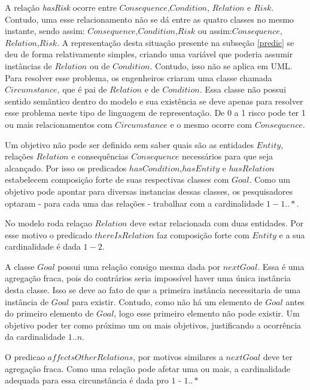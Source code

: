 A relação \textit{hasRisk} ocorre entre $Consequence$,$Condition$, $Relation$ e $Risk$. Contudo, uma esse relacionamento 
não se dá entre as quatro classes no mesmo instante, sendo assim: $Consequence$,$Condition$,$Risk$ ou assim:$Consequence$,$Relation$,$Risk$. A representação 
desta situação presente na subseção \ref{predic} se deu de forma relativamente simples, criando uma variável que poderia assumir instâncias de $Relation$ 
ou de $Condition$. Contudo, isso não se aplica em UML. Para resolver esse problema, os engenheiros criaram uma classe chamada $Circumstance$, que é pai 
de $Relation$ e de $Condition$. Essa classe não possui sentido semântico dentro do modelo e sua existência se deve apenas para resolver esse problema 
neste tipo de linguagem de representação. De 0 a 1 risco pode ter 1 ou mais relacionamentos com $Circumstance$ e o mesmo ocorre com $Consequence$. 

Um objetivo não pode ser definido sem saber quais são as entidades $Entity$, relações $Relation$ e consequências $Consequence$ necessários para que 
seja alcançado. Por isso os predicados $hasCondition$,$hasEntity$ e $hasRelation$ estabelecem composição forte de suas respectivas classes com $Goal$. 
Como um objetivo pode apontar para diversas instancias dessas classes, os pesquisadores optaram - para cada uma das relações - trabalhar com a cardinalidade 
$1 - 1 .. *$.

No modelo roda relaçao $Relation$ deve estar relacionada com duas entidades. Por esse motivo o predicado $thereIsRelation$ faz composição forte com 
$Entity$ e a sua cardinalidade é dada $1 - 2$. 

A classe $Goal$ possui uma relação consigo mesma dada por $nextGoal$. Essa é uma agregação fraca, pois do contrários seria impossível haver uma única instância desta classe. 
Isso se deve ao fato de que a primeira instância necessitaria de uma instância de $Goal$ para existir. Contudo, como não há um elemento de $Goal$ antes 
do primeiro elemento de $Goal$, logo esse primeiro elemento não pode existir. Um objetivo poder ter como próximo um ou mais objetivos, justificando 
a ocorrência da cardinalidade $1 .. n$. 

O predicao $affectsOtherRelations$, por motivos similares a $nextGoal$ deve ter agregação fraca. Como uma relação pode afetar uma ou mais, a cardinalidade 
adequada para essa circunstância é dada pro $1$ - $1 ..*$